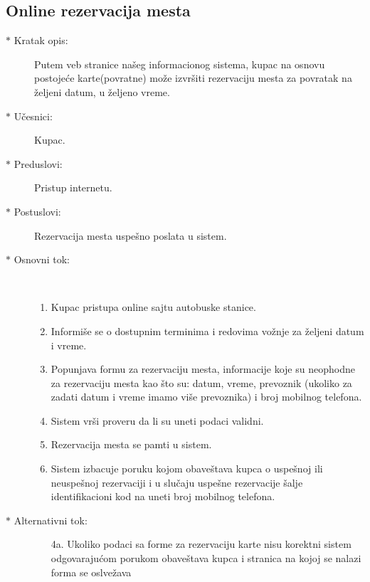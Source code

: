 \subsection{Online rezervacija mesta}
\begin{description}
	\item [$\ast$ Kratak opis: ] Putem veb stranice na\v seg informacionog sistema, kupac na osnovu postoje\' ce karte(povratne) mo\v ze izvr\v siti rezervaciju mesta za povratak na \v zeljeni datum, u \v zeljeno vreme.
	\item[$\ast$ U\v cesnici: ] Kupac.
	\item[$\ast$ Preduslovi: ] Pristup internetu.
	\item[$\ast$ Postuslovi: ] Rezervacija mesta uspe\v sno poslata u sistem.
	\item[$\ast$ Osnovni tok: ] \ \\
	\renewcommand{\labelenumii}{\Roman{enumii}}
	\begin{enumerate}
		\item Kupac pristupa online sajtu autobuske stanice.
		\item Informi\v se se o dostupnim terminima i redovima vo\v znje za \v zeljeni datum i vreme.
		\item Popunjava formu za rezervaciju mesta, informacije koje su neophodne za rezervaciju mesta kao \v sto su: datum, vreme, prevoznik (ukoliko za zadati datum i vreme imamo vi\v se prevoznika) i broj mobilnog telefona.
		\item Sistem vr\v si proveru da li su uneti podaci validni.
		\item Rezervacija mesta se pamti u sistem.
		\item Sistem izbacuje poruku kojom obave\v stava kupca o uspe\v snoj ili neuspe\v snoj rezervaciji i u slu\v caju uspe\v sne rezervacije \v salje identifikacioni kod na uneti broj mobilnog telefona.
	\end{enumerate}
	\item[$\ast$ Alternativni tok: ]
	\begin{enumerate}
	\item[4a. ] Ukoliko podaci sa forme za rezervaciju karte nisu korektni sistem odgovaraju\' com porukom obave\v stava kupca i stranica na kojoj se nalazi forma se oslve\v zava
	\end{enumerate}
\end{description}
\newpage
